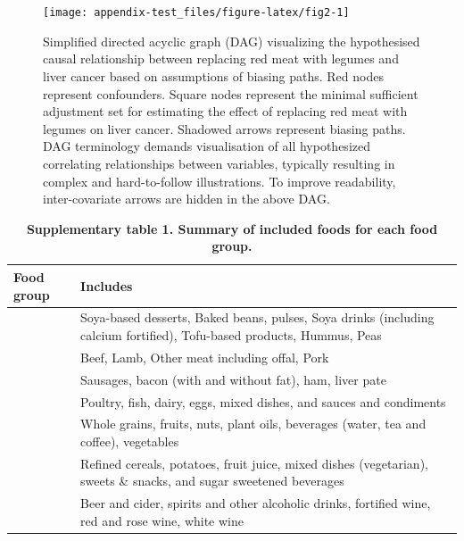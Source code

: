 \documentclass[nutrients,article,submit,moreauthors,pdftex]{Definitions/mdpi}
\begin{document}
\appendixstart
\appendix
\section[\appendixname]{}

\begin{figure}[h]

{\centering \texttt{[image: appendix-test\_files/figure-latex/fig2-1]}

}

\caption{Simplified directed acyclic graph (DAG) visualizing the hypothesised causal relationship between replacing red meat with legumes and liver cancer based on assumptions of biasing paths. Red nodes represent confounders. Square nodes represent the minimal sufficient adjustment set for estimating the effect of replacing red meat with legumes on liver cancer. Shadowed arrows represent biasing paths. DAG terminology demands visualisation of all hypothesized correlating relationships between variables, typically resulting in complex and hard-to-follow illustrations. To improve readability, inter-covariate arrows are hidden in the above DAG.}\label{fig:fig2}
\end{figure}

\begin{table}[t]
\caption{
\label{tab:food-group}\textbf{Supplementary table 1. Summary of included foods for each food group.}}
\fontsize{9.0pt}{10.8pt}\selectfont
\begin{tabular*}{1\linewidth}{@{\extracolsep{\fill}}>{\raggedright\arraybackslash}p{}>{\raggedright\arraybackslash}p{}}
\toprule
\textbf{Food group} & \textbf{Includes} \\
\midrule\addlinespace[2.5pt]
{\bfseries Legumes} & Soya-based desserts, Baked beans, pulses, Soya drinks (including calcium fortified),
  Tofu-based products, Hummus, Peas \\
{\bfseries Red meat} & Beef, Lamb, Other meat including offal, Pork \\
{\bfseries Processed meat} & Sausages, bacon (with and without fat), ham, liver pate \\
{\bfseries Animal-based foods} & Poultry, fish, dairy, eggs, mixed dishes, and sauces and condiments \\
{\bfseries Healthy plant-based foods} & Whole grains, fruits, nuts, plant oils, beverages (water, tea and coffee), vegetables \\
{\bfseries Unhealthy plant-based foods} & Refined cereals, potatoes, fruit juice, mixed dishes (vegetarian), sweets \& snacks, and sugar sweetened beverages \\
{\bfseries Alcoholic beverages} & Beer and cider, spirits and other alcoholic drinks, fortified wine, red and rose wine, white wine \\
\bottomrule
\end{tabular*}
\end{table}
\end{document}
